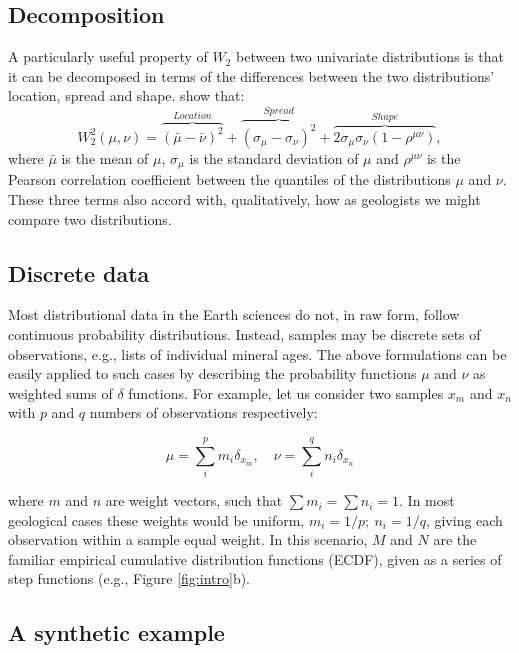 \documentclass[gchron, manuscript]{article}
\begin{document}
\subsection{Decomposition}

A particularly useful property of $W_2$ between two univariate distributions is that it can be decomposed in terms of the differences between the two distributions' location, spread and shape. \cite{irpino_optimal_2007} show that: 
\begin{equation}
    W^2_2(\mu,\nu) = \overbrace{(\bar{\mu} - \bar{\nu})^2}^{Location} + \overbrace{(\sigma_{\mu} - \sigma_{\nu})^2}^{Spread} + \overbrace{2\sigma_{\mu}\sigma_{\nu}(1-\rho^{\mu \nu})}^{Shape},
    \label{eq:decomposition}
\end{equation}
where $\bar{\mu}$ is the mean of $\mu$, $\sigma_{\mu}$ is the standard deviation of $\mu$ and $\rho^{\mu\nu}$ is the Pearson correlation coefficient between the quantiles of the distributions $\mu$ and $\nu$. These three terms also accord with, qualitatively, how as geologists we might compare two distributions. 

\subsection{Discrete data}

Most distributional data in the Earth sciences do not, in raw form, follow continuous probability distributions. Instead, samples may be discrete sets of observations, e.g., lists of individual mineral ages. The above formulations can be easily applied to such cases by describing the probability functions $\mu$ and $\nu$ as weighted sums of $\delta$ functions. For example, let us consider two samples $x_m$ and $x_n$ with $p$ and $q$ numbers of observations respectively: 

\begin{equation}
        \mu = \sum^p_i m_i \delta_{x_m}, \quad
        \nu = \sum^q_i n_i \delta_{x_n}
\end{equation}

where $m$ and $n$ are weight vectors, such that $\sum m_i = \sum n_i = 1$. In most geological cases these weights would be uniform, $m_i = 1/p;~ n_i = 1/q$, giving each observation within a sample equal weight. 
In this scenario, $M$ and $N$ are the familiar empirical cumulative distribution functions (ECDF), given as a series of step functions (e.g., Figure \ref{fig:intro}b). 

\subsection{A synthetic example}
\end{document}
